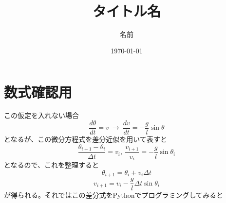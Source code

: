 \documentclass[uplatex]{jsarticle}
\title{タイトル名}
\author{名前}
\date{\today}
\begin{document}
    \maketitle
\section{数式確認用}
この仮定を入れない場合
$$
    \frac{d\theta}{dt}=v\ \rightarrow\ \frac{dv}{dt}=-\frac{g}{l}\sin\theta
$$
となるが、この微分方程式を差分近似を用いて表すと
$$
    \frac{\theta_{i+1}-\theta_{i}}{\Delta t}=v_{i},\ \frac{v_{i+1}}{v_{i}}=-\frac{g}{l}\sin\theta_{i}
$$
となるので、これを整理すると
$$
    \theta_{i+1}=\theta_{i}+v_{i}\Delta t
$$
$$
    v_{i+1}=v_{i}-\frac{g}{l}\Delta t\sin\theta_{i}
$$
が得られる。それではこの差分式をPythonでプログラミングしてみると
\end{document}
